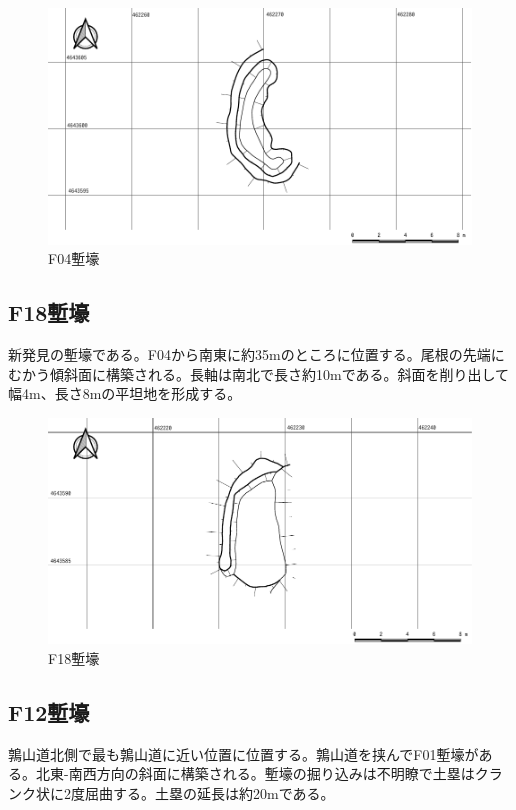 \documentclass[14Q]{jsarticle}
\begin{document}
\begin{figure}[h]
\centering
\includegraphics[width=160truemm]{fig/F04.pdf}
\caption{F04塹壕}
\label{f04}
\end{figure}

\subsection{F18塹壕}
新発見の塹壕である。F04から南東に約35mのところに位置する。尾根の先端にむかう傾斜面に構築される。長軸は南北で長さ約10mである。斜面を削り出して幅4m、長さ8mの平坦地を形成する。

\begin{figure}[h]
\centering
\includegraphics[width=160truemm]{fig/F18.pdf}
\caption{F18塹壕}
\label{f18}
\end{figure}

\subsection{F12塹壕}
鶉山道北側で最も鶉山道に近い位置に位置する。鶉山道を挟んでF01塹壕がある。北東-南西方向の斜面に構築される。塹壕の掘り込みは不明瞭で土塁はクランク状に2度屈曲する。土塁の延長は約20mである。
\end{document}
